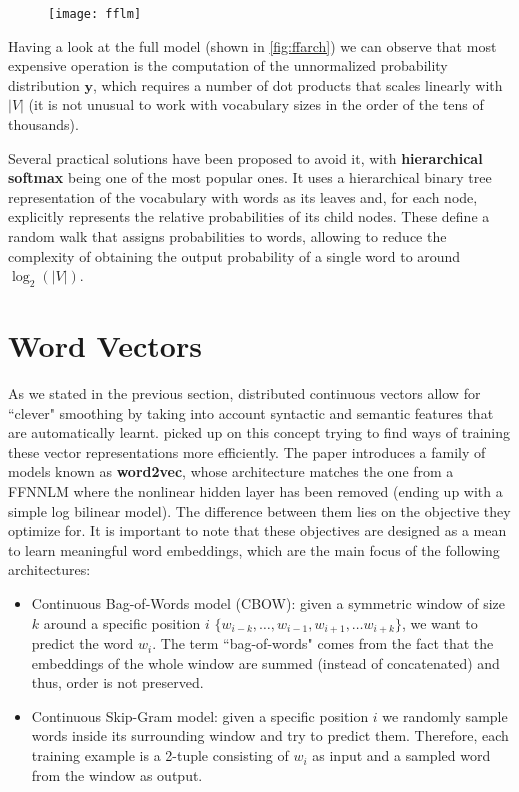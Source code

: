 \begin{figure}[H]
	\centering
	\texttt{[image: fflm]}
	\label{fig:ffarch}
\end{figure}

Having a look at the full model (shown in \autoref{fig:ffarch}) we can observe that most expensive operation is the computation of the unnormalized probability distribution $\mathbf{y}$, which requires a number of dot products that scales linearly with $|V|$ (it is not unusual to work with vocabulary sizes in the order of the tens of thousands). 

Several practical solutions have been proposed to avoid it, with \textbf{hierarchical softmax} \cite{mnih2009scalable} being one of the most popular ones. It uses a hierarchical binary tree representation of the vocabulary with words as its leaves and, for each node, explicitly represents the relative probabilities of its child nodes. These define a random walk that assigns probabilities to words, allowing to reduce the complexity of obtaining the output probability of a single word to around $\log_2(|V|)$.

\section{Word Vectors}
\label{sec:wv}

As we stated in the previous section, distributed continuous vectors allow for ``clever" smoothing by taking into account syntactic and semantic features that are automatically learnt. \cite{mikolov2013efficient} picked up on this concept trying to find ways of training these vector representations more efficiently. The paper introduces a family of models known as \textbf{word2vec}, whose architecture matches the one from a FFNNLM where the nonlinear hidden layer has been removed (ending up with a simple log bilinear model). The difference between them lies on the objective they optimize for. It is important to note that these objectives are designed as a mean to learn meaningful word embeddings, which are the main focus of the following architectures:

\begin{itemize}
	\item Continuous Bag-of-Words model (CBOW): given a symmetric window of size $k$ around a specific position $i$ $\{w_{i-k}, \ldots , w_{i-1}, w_{i+1}, \ldots w_{i+k}\}$, we want to predict the word $w_i$. The term ``bag-of-words" comes from the fact that the embeddings of the whole window are summed (instead of concatenated) and thus, order is not preserved.
	
	\item Continuous Skip-Gram model: given a specific position $i$ we randomly sample words inside its surrounding window and try to predict them. Therefore, each training example is a 2-tuple consisting of $w_i$ as input and a sampled word from the window as output.
\end{itemize}

